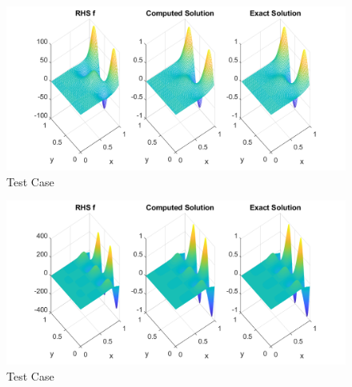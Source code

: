 \begin{enumerate}
\begin{figure}
\centering        
\includegraphics[width=1.0\textwidth]{../code/Case_iv.png}
   \caption{Test Case }
   \label{fig:case4}
\end{figure}

\begin{figure}
\centering        
 \includegraphics[width=1.0\textwidth]{../code/Case_v.png}
   \caption{Test Case }
   \label{fig:case5}
\end{figure}


\end{enumerate}